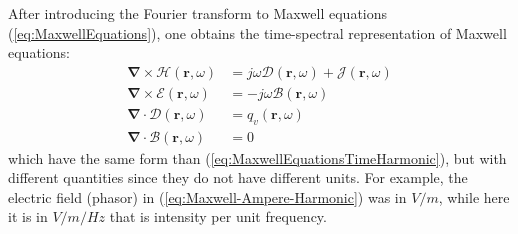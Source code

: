 After introducing the Fourier transform to Maxwell equations (\ref{eq:MaxwellEquations}), one obtains the time-spectral representation of Maxwell equations:
\begin{subequations}
	\begin{align}
	\boldsymbol{\nabla} \times \boldsymbol{\mathcal{H}} (\mathbf{r}, \omega) &= j\omega\boldsymbol{\mathcal{D}} (\mathbf{r}, \omega) + \boldsymbol{\mathcal{J}} (\mathbf{r}, \omega)   \\
	\boldsymbol{\nabla} \times \boldsymbol{\mathcal{E}} (\mathbf{r}, \omega) &= -j\omega\boldsymbol{\mathcal{B}} (\mathbf{r}, \omega)  \\
	\boldsymbol{\nabla} \cdot \boldsymbol{\mathcal{D}} (\mathbf{r}, \omega) &= q_v(\mathbf{r}, \omega)  \\
	\boldsymbol{\nabla} \cdot \boldsymbol{\mathcal{B}} (\mathbf{r}, \omega) &= 0  
	\end{align}
	\label{eq:MaxwellEquationTimeSpectral}
\end{subequations}
which have the same form than (\ref{eq:MaxwellEquationsTimeHarmonic}), but with different quantities since they do not have different units\parencite[sec.1.7.5]{Smith1997}. For example, the electric field (phasor) in (\ref{eq:Maxwell-Ampere-Harmonic}) was in $V/m$, while here it is in $V/m/Hz$ that is intensity per unit frequency. 

